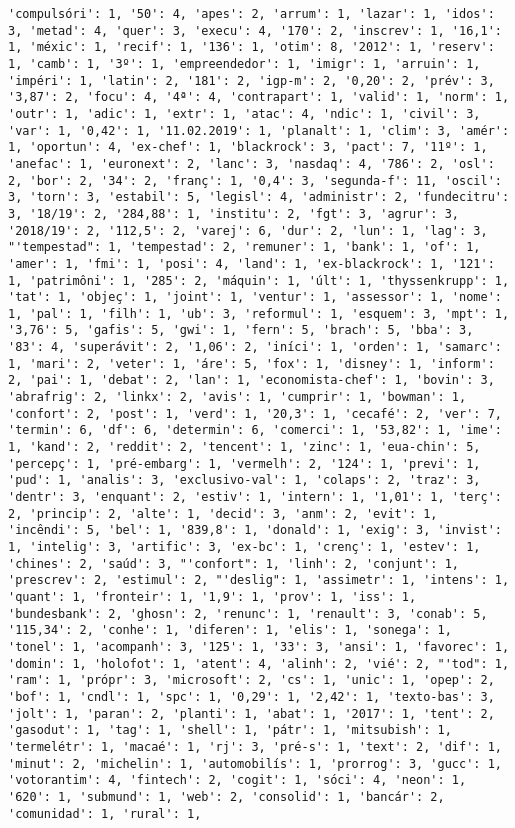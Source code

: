 \documentclass[11pt]{article}
\begin{document}
\begin{Verbatim}[commandchars=\\\{\}]
'compulsóri': 1, '50': 4, 'apes': 2, 'arrum': 1, 'lazar': 1, 'idos': 3, 'metad': 4, 'quer': 3, 'execu': 4, '170': 2, 'inscrev': 1, '16,1': 1, 'méxic': 1, 'recif': 1, '136': 1, 'otim': 8, '2012': 1, 'reserv': 1, 'camb': 1, '3º': 1, 'empreendedor': 1, 'imigr': 1, 'arruin': 1, 'impéri': 1, 'latin': 2, '181': 2, 'igp-m': 2, '0,20': 2, 'prév': 3, '3,87': 2, 'focu': 4, '4ª': 4, 'contrapart': 1, 'valid': 1, 'norm': 1, 'outr': 1, 'adic': 1, 'extr': 1, 'atac': 4, 'ndic': 1, 'civil': 3, 'var': 1, '0,42': 1, '11.02.2019': 1, 'planalt': 1, 'clim': 3, 'amér': 1, 'oportun': 4, 'ex-chef': 1, 'blackrock': 3, 'pact': 7, '11º': 1, 'anefac': 1, 'euronext': 2, 'lanc': 3, 'nasdaq': 4, '786': 2, 'osl': 2, 'bor': 2, '34': 2, 'franç': 1, '0,4': 3, 'segunda-f': 11, 'oscil': 3, 'torn': 3, 'estabil': 5, 'legisl': 4, 'administr': 2, 'fundecitru': 3, '18/19': 2, '284,88': 1, 'institu': 2, 'fgt': 3, 'agrur': 3, '2018/19': 2, '112,5': 2, 'varej': 6, 'dur': 2, 'lun': 1, 'lag': 3, "'tempestad": 1, 'tempestad': 2, 'remuner': 1, 'bank': 1, 'of': 1, 'amer': 1, 'fmi': 1, 'posi': 4, 'land': 1, 'ex-blackrock': 1, '121': 1, 'patrimôni': 1, '285': 2, 'máquin': 1, 'últ': 1, 'thyssenkrupp': 1, 'tat': 1, 'objeç': 1, 'joint': 1, 'ventur': 1, 'assessor': 1, 'nome': 1, 'pal': 1, 'filh': 1, 'ub': 3, 'reformul': 1, 'esquem': 3, 'mpt': 1, '3,76': 5, 'gafis': 5, 'gwi': 1, 'fern': 5, 'brach': 5, 'bba': 3, '83': 4, 'superávit': 2, '1,06': 2, 'iníci': 1, 'orden': 1, 'samarc': 1, 'mari': 2, 'veter': 1, 'áre': 5, 'fox': 1, 'disney': 1, 'inform': 2, 'pai': 1, 'debat': 2, 'lan': 1, 'economista-chef': 1, 'bovin': 3, 'abrafrig': 2, 'linkx': 2, 'avis': 1, 'cumprir': 1, 'bowman': 1, 'confort': 2, 'post': 1, 'verd': 1, '20,3': 1, 'cecafé': 2, 'ver': 7, 'termin': 6, 'df': 6, 'determin': 6, 'comerci': 1, '53,82': 1, 'ime': 1, 'kand': 2, 'reddit': 2, 'tencent': 1, 'zinc': 1, 'eua-chin': 5, 'percepç': 1, 'pré-embarg': 1, 'vermelh': 2, '124': 1, 'previ': 1, 'pud': 1, 'analis': 3, 'exclusivo-val': 1, 'colaps': 2, 'traz': 3, 'dentr': 3, 'enquant': 2, 'estiv': 1, 'intern': 1, '1,01': 1, 'terç': 2, 'princip': 2, 'alte': 1, 'decid': 3, 'anm': 2, 'evit': 1, 'incêndi': 5, 'bel': 1, '839,8': 1, 'donald': 1, 'exig': 3, 'invist': 1, 'intelig': 3, 'artific': 3, 'ex-bc': 1, 'crenç': 1, 'estev': 1, 'chines': 2, 'saúd': 3, "'confort": 1, 'linh': 2, 'conjunt': 1, 'prescrev': 2, 'estimul': 2, "'deslig": 1, 'assimetr': 1, 'intens': 1, 'quant': 1, 'fronteir': 1, '1,9': 1, 'prov': 1, 'iss': 1, 'bundesbank': 2, 'ghosn': 2, 'renunc': 1, 'renault': 3, 'conab': 5, '115,34': 2, 'conhe': 1, 'diferen': 1, 'elis': 1, 'sonega': 1, 'tonel': 1, 'acompanh': 3, '125': 1, '33': 3, 'ansi': 1, 'favorec': 1, 'domin': 1, 'holofot': 1, 'atent': 4, 'alinh': 2, 'vié': 2, "'tod": 1, 'ram': 1, 'própr': 3, 'microsoft': 2, 'cs': 1, 'unic': 1, 'opep': 2, 'bof': 1, 'cndl': 1, 'spc': 1, '0,29': 1, '2,42': 1, 'texto-bas': 3, 'jolt': 1, 'paran': 2, 'planti': 1, 'abat': 1, '2017': 1, 'tent': 2, 'gasodut': 1, 'tag': 1, 'shell': 1, 'pátr': 1, 'mitsubish': 1, 'termelétr': 1, 'macaé': 1, 'rj': 3, 'pré-s': 1, 'text': 2, 'dif': 1, 'minut': 2, 'michelin': 1, 'automobilís': 1, 'prorrog': 3, 'gucc': 1, 'votorantim': 4, 'fintech': 2, 'cogit': 1, 'sóci': 4, 'neon': 1, '620': 1, 'submund': 1, 'web': 2, 'consolid': 1, 'bancár': 2, 'comunidad': 1, 'rural': 1, 
\end{Verbatim}
\end{document}
